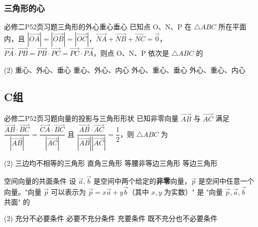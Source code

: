 \subsubsection*{三角形的心}

\begin{choice}{必修二P52页习题}{三角形的外心重心垂心}
	已知点 O、N、P 在 $\triangle ABC$ 所在平面内，且 $|\overrightarrow{OA}|=|\overrightarrow{OB}|=|\overrightarrow{OC}|$，$\overrightarrow{NA} + \overrightarrow{NB} + \overrightarrow{NC} = \vec{0}$，$\overrightarrow{PA} \cdot \overrightarrow{PB} = \overrightarrow{PB} \cdot \overrightarrow{PC} = \overrightarrow{PC} \cdot \overrightarrow{PA}$，则点 O、N、P 依次是 $\triangle ABC$ 的
	\begin{tasks}(2)
		\task 重心、外心、垂心
		\task 重心、外心、内心
		\task 外心、重心、垂心
		\task 外心、重心、内心
	\end{tasks}
\end{choice}

\subsection*{C组}

\begin{choice}{必修二P52页习题}{向量的投影与三角形形状}
	已知非零向量 $\overrightarrow{AB}$ 与 $\overrightarrow{AC}$ 满足 $\dfrac{\overrightarrow{AB} \cdot \overrightarrow{BC}}{|\overrightarrow{AB}|} = \dfrac{\overrightarrow{CA} \cdot \overrightarrow{BC}}{|\overrightarrow{AC}|}$ 且 $\dfrac{\overrightarrow{AB} \cdot \overrightarrow{AC}}{|\overrightarrow{AB}||\overrightarrow{AC}|} = \dfrac{1}{2}$，则 $\triangle ABC$ 为
	\begin{tasks}(2)
		\task 三边均不相等的三角形
		\task 直角三角形
		\task 等腰非等边三角形
		\task 等边三角形
	\end{tasks}
\end{choice}

\begin{choice}{}{空间向量的共面条件}
	设 $\vec{a}, \vec{b}$ 是空间中两个给定的\textbf{非零}向量，$\vec{p}$ 是空间中任意一个向量。"向量 $\vec{p}$ 可以表示为 $\vec{p} = x\vec{a} + y\vec{b}$（其中 $x, y$ 为实数）" 是 "向量 $\vec{p}, \vec{a}, \vec{b}$ 共面" 的
	\begin{tasks}(2)
		\task 充分不必要条件
		\task 必要不充分条件
		\task 充要条件
		\task 既不充分也不必要条件
	\end{tasks}
\end{choice}

\stopexercise
